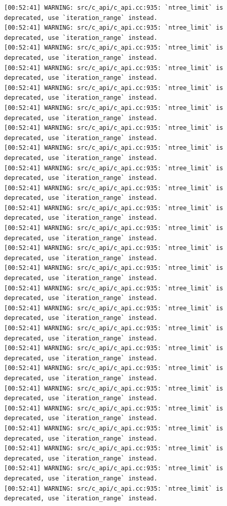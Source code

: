 \documentclass[
  letterpaper,
  DIV=11,
  numbers=noendperiod]{scrartcl}
\begin{document}
\begin{verbatim}
[00:52:41] WARNING: src/c_api/c_api.cc:935: `ntree_limit` is deprecated, use `iteration_range` instead.
[00:52:41] WARNING: src/c_api/c_api.cc:935: `ntree_limit` is deprecated, use `iteration_range` instead.
[00:52:41] WARNING: src/c_api/c_api.cc:935: `ntree_limit` is deprecated, use `iteration_range` instead.
[00:52:41] WARNING: src/c_api/c_api.cc:935: `ntree_limit` is deprecated, use `iteration_range` instead.
[00:52:41] WARNING: src/c_api/c_api.cc:935: `ntree_limit` is deprecated, use `iteration_range` instead.
[00:52:41] WARNING: src/c_api/c_api.cc:935: `ntree_limit` is deprecated, use `iteration_range` instead.
[00:52:41] WARNING: src/c_api/c_api.cc:935: `ntree_limit` is deprecated, use `iteration_range` instead.
[00:52:41] WARNING: src/c_api/c_api.cc:935: `ntree_limit` is deprecated, use `iteration_range` instead.
[00:52:41] WARNING: src/c_api/c_api.cc:935: `ntree_limit` is deprecated, use `iteration_range` instead.
[00:52:41] WARNING: src/c_api/c_api.cc:935: `ntree_limit` is deprecated, use `iteration_range` instead.
[00:52:41] WARNING: src/c_api/c_api.cc:935: `ntree_limit` is deprecated, use `iteration_range` instead.
[00:52:41] WARNING: src/c_api/c_api.cc:935: `ntree_limit` is deprecated, use `iteration_range` instead.
[00:52:41] WARNING: src/c_api/c_api.cc:935: `ntree_limit` is deprecated, use `iteration_range` instead.
[00:52:41] WARNING: src/c_api/c_api.cc:935: `ntree_limit` is deprecated, use `iteration_range` instead.
[00:52:41] WARNING: src/c_api/c_api.cc:935: `ntree_limit` is deprecated, use `iteration_range` instead.
[00:52:41] WARNING: src/c_api/c_api.cc:935: `ntree_limit` is deprecated, use `iteration_range` instead.
[00:52:41] WARNING: src/c_api/c_api.cc:935: `ntree_limit` is deprecated, use `iteration_range` instead.
[00:52:41] WARNING: src/c_api/c_api.cc:935: `ntree_limit` is deprecated, use `iteration_range` instead.
[00:52:41] WARNING: src/c_api/c_api.cc:935: `ntree_limit` is deprecated, use `iteration_range` instead.
[00:52:41] WARNING: src/c_api/c_api.cc:935: `ntree_limit` is deprecated, use `iteration_range` instead.
[00:52:41] WARNING: src/c_api/c_api.cc:935: `ntree_limit` is deprecated, use `iteration_range` instead.
[00:52:41] WARNING: src/c_api/c_api.cc:935: `ntree_limit` is deprecated, use `iteration_range` instead.
[00:52:41] WARNING: src/c_api/c_api.cc:935: `ntree_limit` is deprecated, use `iteration_range` instead.
[00:52:41] WARNING: src/c_api/c_api.cc:935: `ntree_limit` is deprecated, use `iteration_range` instead.
[00:52:41] WARNING: src/c_api/c_api.cc:935: `ntree_limit` is deprecated, use `iteration_range` instead.

\end{verbatim}
\end{document}
